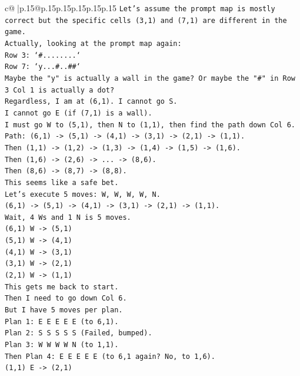 \documentclass{article}
\begin{document}
{\begin{supertabular}{c@{$\;$}|p{.15\linewidth}@{}p{.15\linewidth}p{.15\linewidth}p{.15\linewidth}p{.15\linewidth}p{.15\linewidth}}
{{{\texttt{Let's assume the prompt map is mostly correct but the specific cells (3,1) and (7,1) are different in the game.} \\
\texttt{Actually, looking at the prompt map again:} \\
\texttt{Row 3: `\#........`} \\
\texttt{Row 7: `y...\#..\#\#`} \\
\texttt{Maybe the "y" is actually a wall in the game? Or maybe the "\#" in Row 3 Col 1 is actually a dot?} \\
\texttt{Regardless, I am at (6,1). I cannot go S.} \\
\texttt{I cannot go E (if (7,1) is a wall).} \\
\texttt{I must go W to (5,1), then N to (1,1), then find the path down Col 6.} \\
\texttt{Path: (6,1) {-}> (5,1) {-}> (4,1) {-}> (3,1) {-}> (2,1) {-}> (1,1).} \\
\texttt{Then (1,1) {-}> (1,2) {-}> (1,3) {-}> (1,4) {-}> (1,5) {-}> (1,6).} \\
\texttt{Then (1,6) {-}> (2,6) {-}> ... {-}> (8,6).} \\
\texttt{Then (8,6) {-}> (8,7) {-}> (8,8).} \\
\texttt{This seems like a safe bet.} \\
\texttt{Let's execute 5 moves: W, W, W, W, N.} \\
\texttt{(6,1) {-}> (5,1) {-}> (4,1) {-}> (3,1) {-}> (2,1) {-}> (1,1).} \\
\texttt{Wait, 4 Ws and 1 N is 5 moves.} \\
\texttt{(6,1) W {-}> (5,1)} \\
\texttt{(5,1) W {-}> (4,1)} \\
\texttt{(4,1) W {-}> (3,1)} \\
\texttt{(3,1) W {-}> (2,1)} \\
\texttt{(2,1) W {-}> (1,1)} \\
\texttt{This gets me back to start.} \\
\texttt{Then I need to go down Col 6.} \\
\texttt{But I have 5 moves per plan.} \\
\texttt{Plan 1: E E E E E (to 6,1).} \\
\texttt{Plan 2: S S S S S (Failed, bumped).} \\
\texttt{Plan 3: W W W W N (to 1,1).} \\
\texttt{Then Plan 4: E E E E E (to 6,1 again? No, to 1,6).} \\
\texttt{(1,1) E {-}> (2,1)} \\
}}}
\end{supertabular}}
\end{document}
